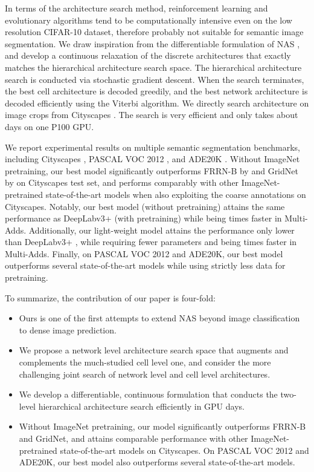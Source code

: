 \documentclass[10pt,twocolumn,letterpaper]{article}
\begin{document}
In terms of the architecture search method, reinforcement learning \cite{zoph2017neural, zoph2017learning} and evolutionary algorithms \cite{real2017large, real2018regularized} tend to be computationally intensive even on the low resolution CIFAR-10 dataset, therefore probably not suitable for semantic image segmentation.
We draw inspiration from the differentiable formulation of NAS \cite{shin2018differentiable, liu2018darts}, and develop a continuous relaxation of the discrete architectures that exactly matches the hierarchical architecture search space.
The hierarchical architecture search is conducted via stochastic gradient descent. 
When the search terminates, the best cell architecture is decoded greedily, and the best network architecture is decoded efficiently using the Viterbi algorithm. 
We directly search architecture on  image crops from Cityscapes \cite{Cordts2016Cityscapes}.
The search is very efficient and only takes about  days on one P100 GPU.

We report experimental results on multiple semantic segmentation benchmarks, including Cityscapes \cite{Cordts2016Cityscapes}, PASCAL VOC 2012 \cite{everingham2014pascal}, and ADE20K \cite{zhou2017scene}. Without ImageNet \cite{ILSVRC15} pretraining, our best model significantly outperforms FRRN-B \cite{pohlen2016full} by  and GridNet \cite{fourure2017residual} by  on Cityscapes test set, and performs comparably with other ImageNet-pretrained state-of-the-art models \cite{wu2016wider,zhao2017pyramid,bulo2017place,deeplabv3plus2018,chen2018searching} when also exploiting the coarse annotations on Cityscapes. Notably, our best model (without pretraining) attains the same performance as DeepLabv3+ \cite{deeplabv3plus2018} (with pretraining) while being  times faster in Multi-Adds. Additionally, our light-weight model attains the performance only  lower than DeepLabv3+ \cite{deeplabv3plus2018}, while requiring  fewer parameters and being  times faster in Multi-Adds. Finally, on PASCAL VOC 2012 and ADE20K, our best model outperforms several state-of-the-art models \cite{zhou2017scene,lin2016refinenet,wu2016wider,zhao2017pyramid,xiao2018unified} while using strictly less data for pretraining.

To summarize, the contribution of our paper is four-fold:
\begin{itemize}
    \item Ours is one of the first attempts to extend NAS beyond image classification to dense image prediction.
    \item We propose a network level architecture search space that augments and complements the much-studied cell level one, and consider the more challenging joint search of network level and cell level architectures.
    \item We develop a differentiable, continuous formulation that conducts the two-level hierarchical architecture search efficiently in  GPU days.
    \item Without ImageNet pretraining, our model significantly outperforms FRRN-B and GridNet, and attains comparable performance with other ImageNet-pretrained state-of-the-art models on Cityscapes. On PASCAL VOC 2012 and ADE20K, our best model also outperforms several state-of-the-art models.
\end{itemize}
\end{document}

